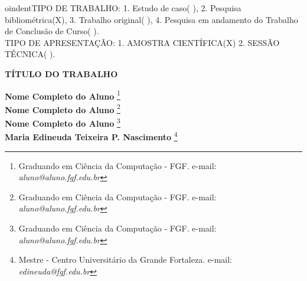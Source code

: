 \documentclass[12pt]{article}
\begin{document}

%



oindent{TIPO DE TRABALHO: 1. Estudo de caso( ), 2. Pesquisa bibliométrica(X), 3. Trabalho original( ), 4. Pesquisa em andamento do Trabalho de Conclusão de Curso( ).\\TIPO DE APRESENTAÇÃO: 1. AMOSTRA CIENTÍFICA(X) 2. SESSÃO TÉCNICA( ).
}

\begin{center}
\textbf{\Large{TÍTULO DO TRABALHO}}\\
\end{center}

\vspace*{0.2cm}

\begin{flushright}
 {\bf Nome Completo do Aluno} \footnote[1]{Graduando em Ciência da Computação - FGF. e-mail: \it aluno@aluno.fgf.edu.br}  \\
 {\bf Nome Completo do Aluno} \footnote[1]{Graduando em Ciência da Computação - FGF. e-mail: \it aluno@aluno.fgf.edu.br} \\
  {\bf Nome Completo do Aluno} \footnote[2]{Graduando em Ciência da Computação - FGF. e-mail: \it aluno@aluno.fgf.edu.br}  \\
   {\bf Maria Edineuda Teixeira P. Nascimento} \footnote[3]{Mestre - Centro Universitário da Grande Fortaleza. e-mail: \it edineuda@fgf.edu.br}   \\
\end{flushright}

\vspace*{0.5cm}

\end{document}
